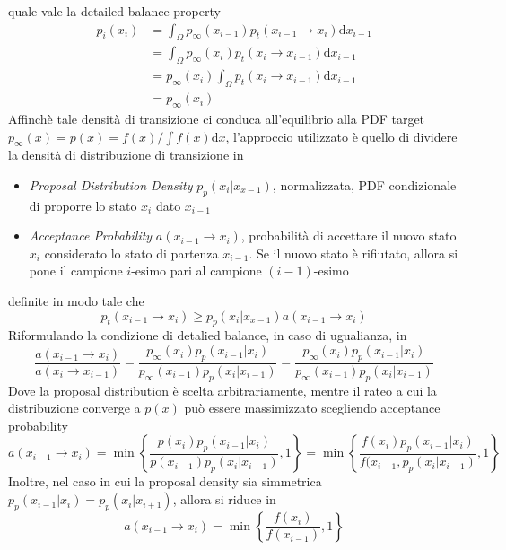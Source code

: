 quale vale la detailed balance property
\begin{align}
	p_i(x_i)&=\int_{\Omega}p_\infty(x_{i-1})p_t(x_{i-1}\to x_i)\mathrm{d}x_{i-1}\nonumber \\
	&=\int_{\Omega}p_\infty(x_i)p_t(x_i\to x_{i-1})\mathrm{d}x_{i-1}\nonumber \\
	&=p_\infty(x_i)\int_{\Omega}p_t(x_i\to x_{i-1})\mathrm{d}x_{i-1}\nonumber \\
	&=p_\infty(x_i)
\end{align}
Affinch\`e tale densit\`a di transizione ci conduca all'equilibrio alla PDF target \mbox{$p_\infty(x)=p(x)=f(x)/\int f(x)\mathrm{d}x$},
l'approccio utilizzato \`e quello di dividere la densit\`a di distribuzione di transizione in 
\begin{itemize}[noitemsep,topsep=0pt]
	\item \textit{Proposal Distribution Density} $p_p(x_i|x_{x-1})$, normalizzata, PDF condizionale di proporre lo stato $x_i$ dato $x_{i-1}$
	\item \textit{Acceptance Probability} $a(x_{i-1}\to x_i)$, probabilit\`a di accettare il nuovo stato $x_i$ considerato lo stato di partenza 
		$x_{i-1}$. Se il nuovo stato \`e rifiutato, allora si pone il campione $i$-esimo pari al campione $(i-1)$-esimo
\end{itemize}
definite in modo tale che
\begin{equation}
	p_t(x_{i-1}\to x_i)\geq p_p(x_i|x_{x-1})a(x_{i-1}\to x_i)
\end{equation}
Riformulando la condizione di detalied balance, in caso di ugualianza, in
\begin{equation}
	\frac{a(x_{i-1}\to x_i)}{a(x_i\to x_{i-1})}=\frac{p_\infty(x_i)p_p(x_{i-1}|x_i)}{p_\infty(x_{i-1})p_p(x_i|x_{i-1})}%
		=\frac{p_\infty(x_i)p_p(x_{i-1}|x_i)}{p_\infty(x_{i-1})p_p(x_i|x_{i-1})}
\end{equation}
Dove la proposal distribution \`e scelta arbitrariamente, mentre il rateo a cui la distribuzione converge a $p(x)$ pu\`o essere massimizzato scegliendo
acceptance probability \cite{pegoraro}
\begin{equation}\label{chapter6:metropolis:acceptance}
	a(x_{i-1}\to x_i)=\min\left\{\frac{p(x_i)p_p(x_{i-1}|x_i)}{p(x_{i-1})p_p(x_i|x_{i-1})}, 1\right\}=
		\min\left\{\frac{f(x_i)p_p(x_{i-1}|x_i)}{f(x_{i-1},p_p(x_i|x_{i-1})}, 1\right\}
\end{equation}
Inoltre, nel caso in cui la proposal density sia simmetrica \mbox{$p_p(x_{i-1}|x_i)=p_p(x_i|x_{i+1})$}, allora si riduce in 
\begin{equation}
	a(x_{i-1}\to x_i)=\min\left\{\frac{f(x_i)}{f(x_{i-1})}, 1\right\}
\end{equation}
